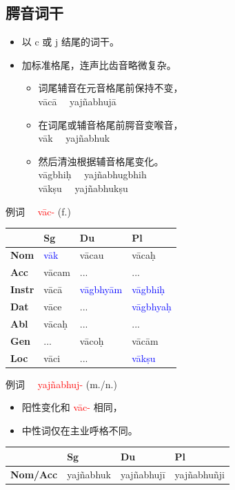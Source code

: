\documentclass[17pt]{beamer}
\newcommand{\nounstem}[1]{\textcolor{red}{#1\nobreakdash-}}
\newcommand{\fullpada}[1]{\textcolor{OliveGreen}{#1}}
\newcommand{\important}[1]{\textcolor{blue}{#1}}
\begin{document}
\subsection{腭音词干}
\begin{frame}{\insertsubsection}
  \small
  \begin{itemize}
    \item 以 c 或 j 结尾的词干。
    \item 加标准格尾，连声比齿音略微复杂。
    \begin{itemize}
      \item 词尾辅音在元音格尾前保持不变，\\ \fullpada{vācā} ~~\fullpada{yajñabhujā}
      \item 在词尾或辅音格尾前腭音变喉音，\\ \fullpada{vāk}~~ \fullpada{yajñabhuk}
      \item 然后清浊根据辅音格尾变化。\\ \fullpada{vāgbhiḥ}~~ \fullpada{yajñabhugbhih}\\\fullpada{vākṣu}~~ \fullpada{yajñabhukṣu}
    \end{itemize}
  \end{itemize}
\end{frame}

\begin{frame}{例词~~ \nounstem{vāc} (f.)}
  \small
  \centering
  \begin{tabular}{|l|l|l|l|}
    \hline
    & \textbf{Sg} & \textbf{Du} & \textbf{Pl} \\
    \hline
    \textbf{Nom} & \important{vāk} & vācau & vācaḥ \\
    \textbf{Acc} & vācam & ... & ... \\
    \textbf{Instr} & vācā & \important{vāgbhyām} & \important{vāgbhiḥ} \\
    \textbf{Dat} & vāce & ... & \important{vāgbhyaḥ} \\
    \textbf{Abl} & vācaḥ & ... & ... \\
    \textbf{Gen} & ... & vācoḥ & vācām \\
    \textbf{Loc} & vāci & ... & \important{vākṣu} \\
    \hline
  \end{tabular}
\end{frame}

\begin{frame}{例词~~ \nounstem{yajñabhuj} (m./n.)}
  \small
  \begin{itemize}
    \item 阳性变化和 \nounstem{vāc} 相同，
    \item   中性词仅在主业呼格不同。
  \end{itemize}
    \centering
  \begin{tabular}{|l|l|l|l|}
    \hline
    & \textbf{Sg} & \textbf{Du} & \textbf{Pl} \\
    \hline
    \textbf{Nom/Acc} & yajñabhuk & yajñabhujī & yajñabhuñji  \\
    \hline
  \end{tabular}

\end{frame}
\end{document}
